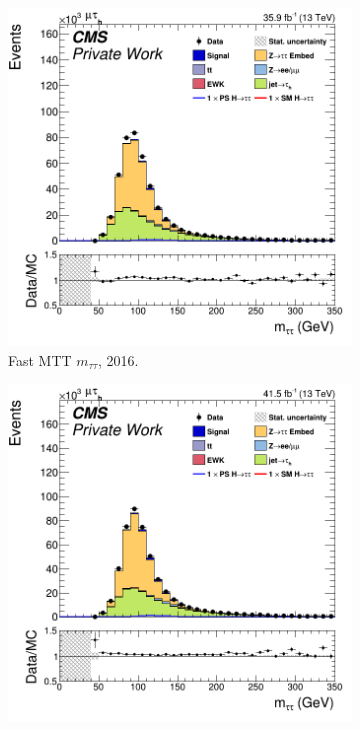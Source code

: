 \begin{figure}
  \begin{subfigure}[b]{0.33\linewidth}
    \centering
    \includegraphics[width=\linewidth]{Chapitre7/Images/CtrlPlots/2016/fastMTTditauMass.png} 
    \caption{Fast MTT $m_{\tau\tau}$, 2016.} 
    \vspace{0.5ex}
  \end{subfigure}%
  \begin{subfigure}[b]{0.33\linewidth}
    \centering
    \includegraphics[width=\linewidth]{Chapitre7/Images/CtrlPlots/2017/fastMTTditauMass.png} 

\end{subfigure}
\end{figure}
